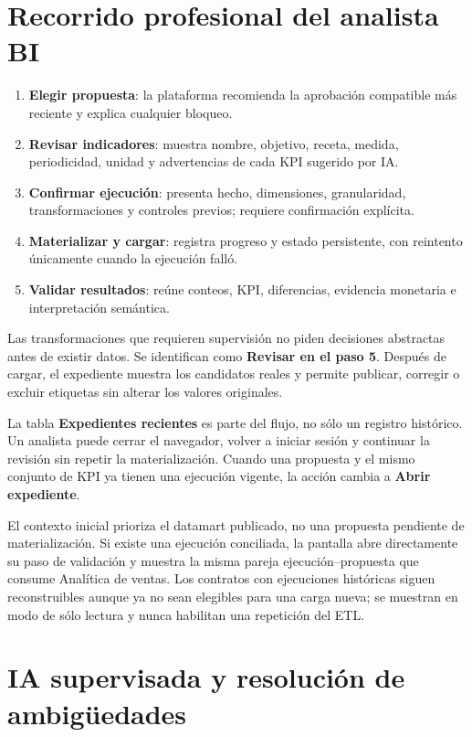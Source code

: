 \documentclass[11pt,letterpaper]{article}
\begin{document}
\section{Recorrido profesional del analista BI}

\begin{enumerate}
  \item \textbf{Elegir propuesta}: la plataforma recomienda la aprobación compatible más reciente y explica cualquier bloqueo.
  \item \textbf{Revisar indicadores}: muestra nombre, objetivo, receta, medida, periodicidad, unidad y advertencias de cada KPI sugerido por IA.
  \item \textbf{Confirmar ejecución}: presenta hecho, dimensiones, granularidad, transformaciones y controles previos; requiere confirmación explícita.
  \item \textbf{Materializar y cargar}: registra progreso y estado persistente, con reintento únicamente cuando la ejecución falló.
  \item \textbf{Validar resultados}: reúne conteos, KPI, diferencias, evidencia monetaria e interpretación semántica.
\end{enumerate}

Las transformaciones que requieren supervisión no piden decisiones abstractas antes de existir datos. Se identifican como \textbf{Revisar en el paso 5}. Después de cargar, el expediente muestra los candidatos reales y permite publicar, corregir o excluir etiquetas sin alterar los valores originales.

La tabla \textbf{Expedientes recientes} es parte del flujo, no sólo un registro histórico. Un analista puede cerrar el navegador, volver a iniciar sesión y continuar la revisión sin repetir la materialización. Cuando una propuesta y el mismo conjunto de KPI ya tienen una ejecución vigente, la acción cambia a \textbf{Abrir expediente}.

El contexto inicial prioriza el datamart publicado, no una propuesta pendiente de
materialización. Si existe una ejecución conciliada, la pantalla abre directamente su paso
de validación y muestra la misma pareja ejecución--propuesta que consume Analítica de
ventas. Los contratos con ejecuciones históricas siguen reconstruibles aunque ya no sean
elegibles para una carga nueva; se muestran en modo de sólo lectura y nunca habilitan una
repetición del ETL.

\section{IA supervisada y resolución de ambigüedades}
\end{document}
